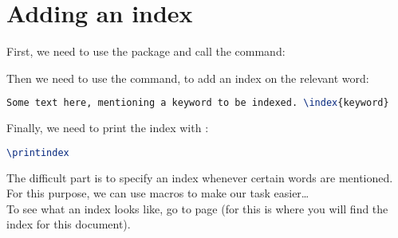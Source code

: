 \section{Adding an index} \label{add-index}

First, we need to use the  package and call the  command:

 

Then we need to use the  command, to add an index on the relevant word:

\begin{lstlisting}[language=tex]
Some text here, mentioning a keyword to be indexed. \index{keyword}
\end{lstlisting}


Finally, we need to print the index with  :

\begin{lstlisting}[language=tex]
\printindex
\end{lstlisting}

The difficult part is to specify an index whenever certain words are mentioned.
For this purpose, we can use macros to make our task easier\ldots \\

To see what an index looks like, go to page \pageref{our-index} (for this is where you will find the index for this document).

